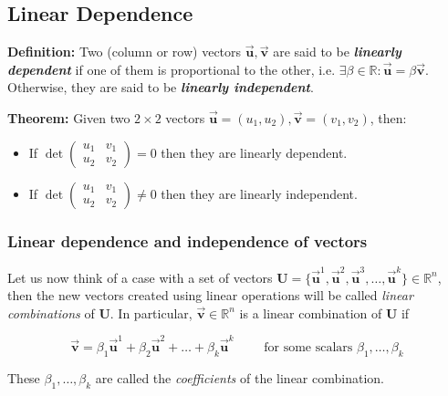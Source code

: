 \documentclass[11pt]{article}
\begin{document}
    \hypertarget{linear-dependence}{%
\subsection{Linear Dependence}\label{linear-dependence}}

\textbf{Definition:} Two (column or row) vectors
\(\vec{\mathbf{u}},\vec{\mathbf{v}}\) are said to be
\textbf{\emph{linearly dependent}} if one of them is proportional to the
other, i.e.
\(\exists\beta\in\mathbb{R} : \vec{\mathbf{u}} = \beta\vec{\mathbf{v}}\).
Otherwise, they are said to be \textbf{\emph{linearly independent}}.

\textbf{Theorem:} Given two \(2\times 2\) vectors
\(\vec{\mathbf{u}} = (u_1, u_2), \vec{\mathbf{v}} = (v_1, v_2)\), then:

\begin{itemize}
\item
  If \(\det\begin{pmatrix} u_1 & v_1 \\ u_2 & v_2 \end{pmatrix} = 0\)
  then they are linearly dependent.
\item
  If \(\det\begin{pmatrix} u_1 & v_1 \\ u_2 & v_2 \end{pmatrix} \neq 0\)
  then they are linearly independent.
\end{itemize}

\hypertarget{linear-dependence-and-independence-of-vectors}{%
\subsubsection{Linear dependence and independence of
vectors}\label{linear-dependence-and-independence-of-vectors}}

Let us now think of a case with a set of vectors
\(\mathbf{U} = \{\vec{\mathbf{u}}^1,\vec{\mathbf{u}}^2,\vec{\mathbf{u}}^3,\ldots,\vec{\mathbf{u}}^k\}\in\mathbb{R}^n\),
then the new vectors created using linear operations will be called
\emph{linear combinations} of \(\mathbf{U}\). In particular,
\(\vec{\mathbf{v}}\in\mathbb{R}^n\) is a linear combination of
\(\mathbf{U}\) if

\[
\vec{\mathbf{v}} = \beta_1\vec{\mathbf{u}}^1 + \beta_2\vec{\mathbf{u}}^2 + \ldots + \beta_k\vec{\mathbf{u}}^k \qquad \text{ for some scalars } \beta_1,\ldots, \beta_k
\]

These \(\beta_1,\ldots,\beta_k\) are called the \emph{coefficients} of
the linear combination.
\end{document}
